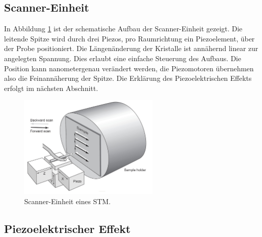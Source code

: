 \subsection{Scanner-Einheit}


In Abbildung \ref{scan} ist der schematische Aufbau der Scanner-Einheit gezeigt.
Die leitende Spitze wird durch drei Piezos, pro Raumrichtung ein Piezoelement, 
über der Probe positioniert. Die Längenänderung der Kristalle ist annähernd linear
zur angelegten Spannung. Dies erlaubt eine einfache Steuerung des Aufbaus. Die 
Position kann nanometergenau verändert werden, die 
Piezomotoren übernehmen also die Feinannäherung der Spitze.
Die Erklärung des Piezoelektrischen Effekts erfolgt im nächsten Abschnitt.
\begin{figure}[H]
	\centering
	\includegraphics[width=0.6\textwidth]{Abb/scanner.png}
	\caption{Scanner-Einheit eines STM. \cite{nanosurf}}
	\label{scan}
\end{figure}


 \subsection{Piezoelektrischer Effekt}

